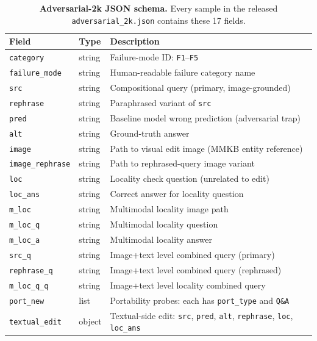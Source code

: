 \documentclass{article}
\begin{document}
\begin{table}[h]
\centering
\caption{\textbf{Adversarial-2k JSON schema.} Every sample in the released \texttt{adversarial\_2k.json} contains these 17 fields.}
\label{tab:schema}
\small
\begin{tabular}{@{}lll@{}}
\toprule
\textbf{Field} & \textbf{Type} & \textbf{Description} \\
\midrule
\texttt{category}      & string  & Failure-mode ID: \texttt{F1}--\texttt{F5} \\
\texttt{failure\_mode} & string  & Human-readable failure category name \\
\texttt{src}           & string  & Compositional query (primary, image-grounded) \\
\texttt{rephrase}      & string  & Paraphrased variant of \texttt{src} \\
\texttt{pred}          & string  & Baseline model wrong prediction (adversarial trap) \\
\texttt{alt}           & string  & Ground-truth answer \\
\texttt{image}         & string  & Path to visual edit image (MMKB entity reference) \\
\texttt{image\_rephrase} & string & Path to rephrased-query image variant \\
\texttt{loc}           & string  & Locality check question (unrelated to edit) \\
\texttt{loc\_ans}      & string  & Correct answer for locality question \\
\texttt{m\_loc}        & string  & Multimodal locality image path \\
\texttt{m\_loc\_q}     & string  & Multimodal locality question \\
\texttt{m\_loc\_a}     & string  & Multimodal locality answer \\
\texttt{src\_q}        & string  & Image+text level combined query (primary) \\
\texttt{rephrase\_q}   & string  & Image+text level combined query (rephrased) \\
\texttt{m\_loc\_q\_q}  & string  & Image+text level locality combined query \\
\texttt{port\_new}     & list    & Portability probes: each has \texttt{port\_type} and \texttt{Q\&A} \\
\texttt{textual\_edit} & object  & Textual-side edit: \texttt{src}, \texttt{pred}, \texttt{alt}, \texttt{rephrase}, \texttt{loc}, \texttt{loc\_ans} \\
\bottomrule
\end{tabular}
\end{table}
\end{document}
